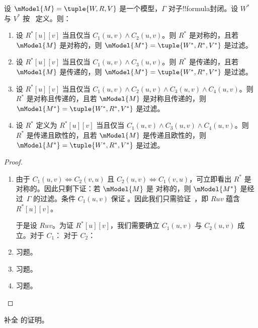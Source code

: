 \documentclass[../../../include/open-logic-section]{subfiles}
\begin{document}
\begin{thm}
  设 $\mModel{M} =\tuple{W,R,V}$ 是一个模型，$\Gamma$ 对子!!{formula}封闭。设 $W^*$ 与 $V^*$ 按~ 定义。则：
  \begin{enumerate}
  \item 设 $R^*[u][v]$ 当且仅当 $C_1(u, v) \land
    C_2(u,v)$。则 $R^*$ 是对称的，且若 $\mModel{M}$ 是对称的，则 $\mModel{M^*} =
    \tuple{W^*,R^*,V^*}$ 是过滤。
  \item 设 $R^*[u][v]$ 当且仅当 $C_1(u, v)
    \land C_3(u,v)$。则 $R^*$ 是传递的，且若 $\mModel{M}$
    是传递的，则 $\mModel{M^*}=\tuple{W^*,R^*,V^*}$ 是过滤。
  \item 设 $R^*[u][v]$ 当且仅当 $C_1(u, v) \land C_2(u,v)
    \land C_3(u,v) \land C_4(u,v)$。则 $R^*$ 是对称且传递的，且若 $\mModel{M}$ 是对称且传递的，则 $\mModel{M^*}=\tuple{W^*,R^*,V^*}$ 是过滤。
  \item 设 $R^*$ 定义为 $R^*[u][v]$ 当且仅当 $C_1(u,
    v) \land C_3(u,v) \land C_4(u,v)$。则 $R^*$ 是传递且欧性的，且若 $\mModel{M}$ 是传递且欧性的，则 $\mModel{M^*}=\tuple{W^*,R^*,V^*}$ 是过滤。
  \end{enumerate}
\end{thm}

\begin{proof}
  \begin{enumerate}
    \item 由于 $C_1(u,v)
      \Leftrightarrow C_2(v,u)$ 且 $C_2(u,v) \Leftrightarrow
      C_1(v,u)$，可立即看出 $R^*$ 是对称的。因此只剩下证：若 $\mModel{M}$ 是
      对称的，则 $\mModel{M^*}$ 是经过~$\Gamma$ 的过滤。条件 $C_1(u,v)$ 保证
      。因此我们只需验证~，即 $Ruv$ 蕴含 $R^*[u][v]$。

      于是设 $Ruv$。为证 $R^*[u][v]$，我们需要确立
      $C_1(u,v)$ 与 $C_2(u,v)$ 成立。对于 $C_1$： 对于 $C_2$：
    \item 习题。
    \item 习题。
    \item 习题。
  \end{enumerate}
\end{proof}

\begin{prob}
  补全  的证明。
\end{prob}
\end{document}
